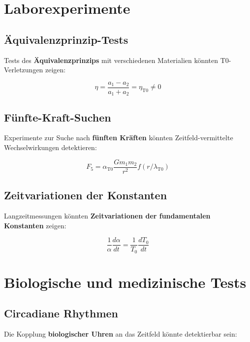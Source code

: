 \documentclass[12pt,a4paper]{report}
\begin{document}
	\section{Laborexperimente}
	
	\subsection{Äquivalenzprinzip-Tests}
	
	Tests des \textbf{Äquivalenzprinzips} mit verschiedenen Materialien könnten T0-Verletzungen zeigen:
	
	\begin{equation}
		\eta = \frac{a_1 - a_2}{a_1 + a_2} = \eta_{\text{T0}} \neq 0
	\end{equation}
	
	\subsection{Fünfte-Kraft-Suchen}
	
	Experimente zur Suche nach \textbf{fünften Kräften} könnten Zeitfeld-vermittelte Wechselwirkungen detektieren:
	
	\begin{equation}
		F_5 = \alpha_{\text{T0}} \frac{Gm_1m_2}{r^2} f(r/\lambda_{\text{T0}})
	\end{equation}
	
	\subsection{Zeitvariationen der Konstanten}
	
	Langzeitmessungen könnten \textbf{Zeitvariationen der fundamentalen Konstanten} zeigen:
	
	\begin{equation}
		\frac{1}{\alpha}\frac{d\alpha}{dt} = \frac{1}{T_0}\frac{dT_0}{dt}
	\end{equation}
	
	\section{Biologische und medizinische Tests}
	
	\subsection{Circadiane Rhythmen}
	
	Die Kopplung \textbf{biologischer Uhren} an das Zeitfeld könnte detektierbar sein:
	
\end{document}
